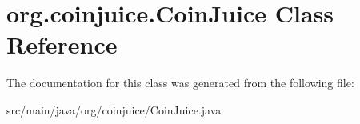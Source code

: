 \hypertarget{classorg_1_1coinjuice_1_1_coin_juice}{\section{org.\-coinjuice.\-Coin\-Juice Class Reference}
\label{classorg_1_1coinjuice_1_1_coin_juice}
}


The documentation for this class was generated from the following file\-:\begin{DoxyCompactItemize}
\item 
src/main/java/org/coinjuice/Coin\-Juice.\-java\end{DoxyCompactItemize}
